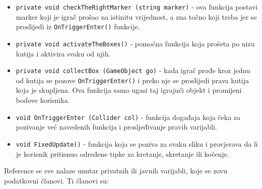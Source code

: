 \begin{itemize}
	\item \texttt{private void checkTheRightMarker (string marker)} - ova funkcija postavi marker koji je igrač prošao na istinitu vrijednost, a zna točno koji treba jer se proslijedi iz \texttt{OnTriggerEnter()} funkcije.
	\item \texttt{private void activateTheBoxes()} - pomoćna funkcija koja prošeta po nizu kutija i aktivira svaku od njih.
	\item \texttt{private void collectBox (GameObject go)} - kada igrač prođe kroz jednu od kutija se pozove \texttt{OnTriggerEnter()} i preko nje se proslijedi prava kutija koja je skupljena. Ova funkcija samo ugasi taj igrajući objekt i promijeni bodove korisnika.
	\item \texttt{void OnTriggerEnter (Collider col)} - funkcija događaja koja čeka za pozivanje već navedenih funkcija i prosljeđivanje pravih varijabli.
	\item \texttt{void FixedUpdate()} - funkcija koja se poziva za svaku sliku i provjerava da li je korisnik pritisnuo određene tipke za kretanje, skretanje ili kočenje.
\end{itemize}
Reference se sve nalaze unutar privatnih ili javnih varijabli, koje se zovu podatkovni članovi. Ti članovi su:
